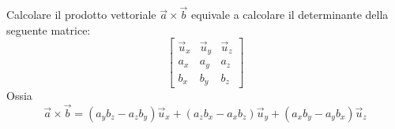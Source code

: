 \documentclass[10pt,a4paper]{book}
\begin{document}
Calcolare il prodotto vettoriale $\vec{a} \times \vec{b}$ equivale a calcolare il determinante della seguente matrice:
\[
	\begin{bmatrix}
		\vec{u}_x & \vec{u}_y & \vec{u}_z \\
		a_x & a_y & a_z \\
		b_x & b_y & b_z
	\end{bmatrix}
\]
Ossia
\[
	\vec{a} \times \vec{b} = (a_y b_z - a_z b_y)\vec{u}_x + (a_z b_x - a_x b_z) \vec{u}_y + (a_x b_y - a_y b_x) \vec{u}_z
\]
\end{document}
